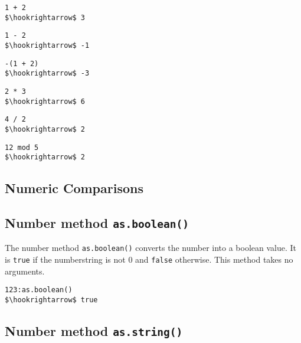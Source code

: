 \documentclass[11pt,a4paper]{scrbook}
\newcommand\keyword[1]{\texttt{#1}}
\newcommand\method[1]{\texttt{#1}}
\begin{document}

\begin{lstlisting}[language=BibTool,mathescape=true]
1 + 2
$\hookrightarrow$ 3
\end{lstlisting}

\begin{lstlisting}[language=BibTool,mathescape=true]
1 - 2
$\hookrightarrow$ -1
\end{lstlisting}

\begin{lstlisting}[language=BibTool,mathescape=true]
-(1 + 2)
$\hookrightarrow$ -3
\end{lstlisting}

\begin{lstlisting}[language=BibTool,mathescape=true]
2 * 3
$\hookrightarrow$ 6
\end{lstlisting}

\begin{lstlisting}[language=BibTool,mathescape=true]
4 / 2
$\hookrightarrow$ 2
\end{lstlisting}

\begin{lstlisting}[language=BibTool,mathescape=true]
12 mod 5
$\hookrightarrow$ 2
\end{lstlisting}

\subsection{Numeric Comparisons}


\subsection{Number method \method{as.boolean()}}

The number method \method{as.boolean()} converts the number into a boolean
value. It is \keyword{true} if the numberstring is not 0 and \keyword{false}
otherwise. This method takes no arguments.

\begin{lstlisting}[language=BibTool,mathescape=true]
123:as.boolean()
$\hookrightarrow$ true
\end{lstlisting}

\subsection{Number method \method{as.string()}}
\end{document}
